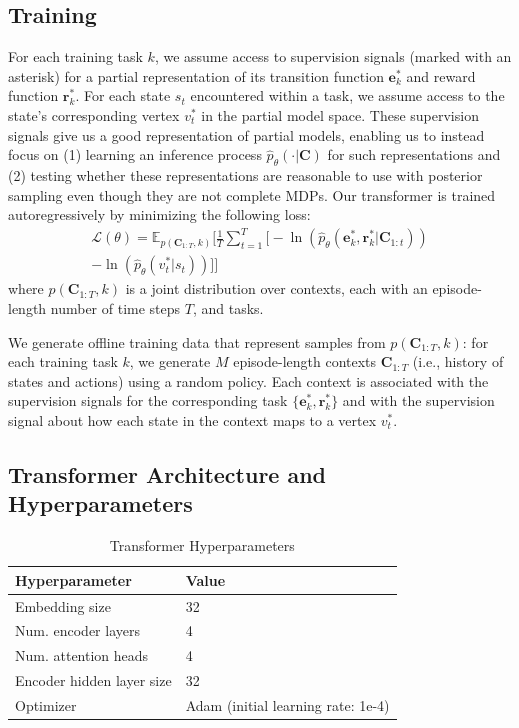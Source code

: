 \documentclass[sigconf]{aamas}
\begin{document}
\subsection{Training}
For each training task $k$, we assume access to supervision signals (marked with an asterisk) for a partial representation of its transition function $\mathbf{e}_k^*$ and reward function $\mathbf{r}_k^*$. For each state $s_t$ encountered within a task, we assume access to the state's corresponding vertex $v_t^*$ in the partial model space. These supervision signals give us a good representation of partial models, enabling us to instead focus on (1) learning an inference process $\hat{p}_\theta(\cdot|\mathbf{C})$ for such representations and (2) testing whether these representations are reasonable to use with posterior sampling even though they are not complete MDPs. Our transformer is trained autoregressively by minimizing the following loss:
\begin{align*}
  \mathcal{L}(\theta) = \mathbb{E}_{p(\mathbf{C}_{1:T}, k)} \bigg[ \frac{1}{T}\sum_{t=1}^{T} \big[ - \ln(\hat{p}_\theta(\mathbf{e}^*_k, \mathbf{r}_{k}^*|\mathbf{C}_{1:t})) \\
  - \ln(\hat{p}_\theta(v_t^*|s_t)) \big] \bigg]
\end{align*}
where $p(\mathbf{C}_{1:T}, k)$ is a joint distribution over contexts, each with an episode-length number of time steps $T$, and tasks.

We generate offline training data that represent samples from $p(\mathbf{C}_{1:T}, k)$: for each training task $k$, we generate $M$ episode-length contexts $\mathbf{C}_{1:T}$ (i.e., history of states and actions) using a random policy. Each context is associated with the supervision signals for the corresponding task $\{\mathbf{e}^*_k, \mathbf{r}_{k}^*\}$ and with the supervision signal about how each state in the context maps to a vertex $v_t^*$.

\subsection{Transformer Architecture and Hyperparameters}\label{sec:transformer}

\begin{table}[t]
\centering
\caption{Transformer Hyperparameters}
\begin{tabular}{@{}ll@{}}
\toprule
Hyperparameter            & Value                              \\ \midrule
Embedding size            & 32                                 \\
Num. encoder layers       & 4                                  \\
Num. attention heads      & 4                                  \\
Encoder hidden layer size & 32                                 \\
Optimizer                 & Adam (initial learning rate: 1e-4) \\ \bottomrule
\end{tabular}
\label{tab:hyperparams}
\end{table}
\end{document}
